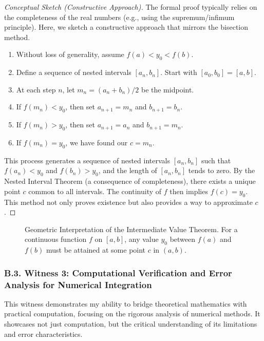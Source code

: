 \documentclass[11pt, a4paper]{article}
\theoremstyle{plain} %
\theoremstyle{definition} %
\theoremstyle{remark} %
\begin{document}
\begin{proof}[Conceptual Sketch (Constructive Approach)]
    The formal proof typically relies on the completeness of the real numbers (e.g., using the supremum/infimum principle). Here, we sketch a constructive approach that mirrors the bisection method.
    \begin{enumerate}
        \item Without loss of generality, assume \( f(a) < y_0 < f(b) \).
        \item Define a sequence of nested intervals \( [a_n, b_n] \). Start with \( [a_0, b_0] = [a,b] \).
        \item At each step \( n \), let \( m_n = (a_n+b_n)/2 \) be the midpoint.
        \item If \( f(m_n) < y_0 \), then set \( a_{n+1} = m_n \) and \( b_{n+1} = b_n \).
        \item If \( f(m_n) > y_0 \), then set \( a_{n+1} = a_n \) and \( b_{n+1} = m_n \).
        \item If \( f(m_n) = y_0 \), we have found our \( c = m_n \).
    \end{enumerate}
    This process generates a sequence of nested intervals \( [a_n, b_n] \) such that \( f(a_n) < y_0 \) and \( f(b_n) > y_0 \), and the length of \( [a_n, b_n] \) tends to zero. By the Nested Interval Theorem (a consequence of completeness), there exists a unique point \( c \) common to all intervals. The continuity of \( f \) then implies \( f(c) = y_0 \). This method not only proves existence but also provides a way to approximate \( c \).
\end{proof}

\begin{figure}[htbp]
    \centering
    \caption{Geometric Interpretation of the Intermediate Value Theorem. For a continuous function \(f\) on \([a,b]\), any value \(y_0\) between \(f(a)\) and \(f(b)\) must be attained at some point \(c\) in \((a,b)\).}
    \label{fig:ivt_geometric}
\end{figure}

\subsubsection*{B.3. Witness 3: Computational Verification and Error Analysis for Numerical Integration}
\label{subsec:witness_computation}

This witness demonstrates my ability to bridge theoretical mathematics with practical computation, focusing on the rigorous analysis of numerical methods. It showcases not just computation, but the critical understanding of its limitations and error characteristics.
\end{document}
